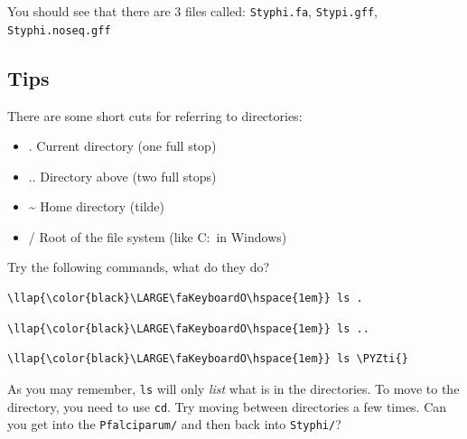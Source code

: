 \documentclass[11pt]{article}
\providecommand{\tightlist}{%
      \setlength{\itemsep}{0pt}\setlength{\parskip}{0pt}}
\def\PYZti{\char`\~}
\begin{document}
    You should see that there are 3 files called: \texttt{Styphi.fa},
\texttt{Stypi.gff}, \texttt{Styphi.noseq.gff}

    \hypertarget{tips}{%
\subsection{Tips}\label{tips}}

There are some short cuts for referring to directories:

\begin{itemize}
\tightlist
\item
  . Current directory (one full stop)
\item
  .. Directory above (two full stops)
\item
  \textasciitilde{} Home directory (tilde)
\item
  / Root of the file system (like C:~in Windows)
\end{itemize}

Try the following commands, what do they do?

\begin{terminalinput}
\begin{Verbatim}[commandchars=\\\{\}]
\llap{\color{black}\LARGE\faKeyboardO\hspace{1em}} ls .
\end{Verbatim}
\end{terminalinput}

\begin{terminalinput}
\begin{Verbatim}[commandchars=\\\{\}]
\llap{\color{black}\LARGE\faKeyboardO\hspace{1em}} ls ..
\end{Verbatim}
\end{terminalinput}

\begin{terminalinput}
\begin{Verbatim}[commandchars=\\\{\}]
\llap{\color{black}\LARGE\faKeyboardO\hspace{1em}} ls \PYZti{}
\end{Verbatim}
\end{terminalinput}

    As you may remember, \texttt{ls} will only \textit{list} what is in the
directories. To move to the directory, you need to use \texttt{cd}. Try
moving between directories a few times. Can you get into the
\texttt{Pfalciparum/} and then back into \texttt{Styphi/}?
\end{document}
